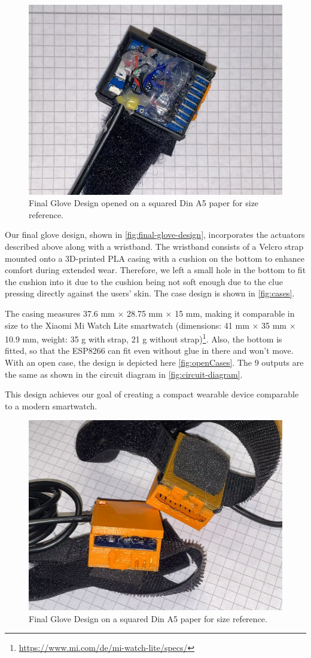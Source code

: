 \begin{figure}
    \centering
    \includegraphics[width=0.5\linewidth]{src/pictures/GloveDesigns/openCase.jpg}
    \caption{Final Glove Design opened on a squared Din A5 paper for size reference.}
    \label{fig:openCases}
\end{figure}

Our final glove design, shown in \autoref{fig:final-glove-design}, incorporates the actuators described above along with a wristband. The wristband consists of a Velcro strap mounted onto a 3D-printed PLA casing with a cushion on the bottom to enhance comfort during extended wear. Therefore, we left a small hole in the bottom to fit the cushion into it due to the cushion being not soft enough due to the clue pressing directly against the users' skin. The case design is shown in \autoref{fig:cases}.

The casing measures 37.6 mm $\times$ 28.75 mm $\times$ 15 mm, making it comparable in size to the Xiaomi Mi Watch Lite smartwatch (dimensions: 41 mm × 35 mm × 10.9 mm, weight: 35 g with strap, 21 g without strap)\footnote{\url{https://www.mi.com/de/mi-watch-lite/specs/}}. Also, the bottom is fitted, so that the ESP8266 can fit even without glue in there and won't move.
With an open case, the design is depicted here \autoref{fig:openCases}. The 9 outputs are the same as shown in the circuit diagram in \autoref{fig:circuit-diagram}.

This design achieves our goal of creating a compact wearable device comparable to a modern smartwatch.

\begin{figure}
    \centering
    \includegraphics[width=0.5\linewidth]{src/pictures/GloveDesigns/casesFinished.jpg}
    \caption{Final Glove Design on a squared Din A5 paper for size reference.}
    \label{fig:final-glove-design}
\end{figure}


